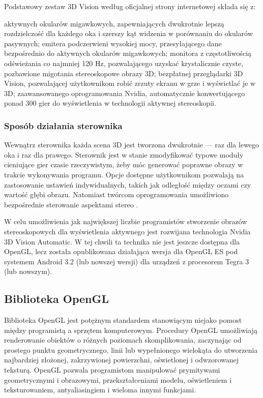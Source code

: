 Podstawowy zestaw 3D Vision według oficjalnej strony internetowej \cite{3dVisionInfo} składa się z: 
\begin{itemize}
\itemi aktywnych okularów migawkowych, zapewniających dwukrotnie lepszą rozdzielczość dla każdego oka i szerszy kąt widzenia w porównaniu do okularów pasywnych;
\itemi emitera podczerwieni wysokiej mocy, przesyłającego dane bezpośrednio do aktywnych okularów migawkowych;
\itemi monitora z częstotliwością odświeżania co najmniej 120 Hz, pozwalającego uzyskać krystalicznie czyste, pozbawione migotania stereoskopowe obrazy 3D;
\itemi bezpłatnej przeglądarki 3D Vision, pozwalającej użytkownikom robić zrzuty ekranu w grze i wyświetlać je w 3D;
\itemi zaawansowanego oprogramowania Nvidia, automatycznie konwertującego ponad 300 gier do wyświetlenia w technologii aktywnej stereoskopii. 
\end{itemize}

\subsubsection{Sposób działania sterownika}
Wewnątrz sterownika każda scena 3D jest tworzona dwukrotnie --- raz dla lewego oka i raz dla prawego. Sterownik jest w stanie zmodyfikować typowe moduły cieniujące gier czasie rzeczywistym, żeby móc generować poprawne obrazy w trakcie wykonywania programu. Opcje dostępne użytkownikom pozwalają na zastosowanie ustawień indywidualnych, takich jak odległość między oczami czy wartość głębi obrazu. Natomiast twórcom oprogramowania umożliwiono bezpośrednie sterowanie aspektami stereo \cite{3dVisionInfo}.

W celu umożliwienia jak największej liczbie programistów stworzenie obrazów stereoskopowych dla wyświetlenia aktywnego jest rozwijana technologia Nvidia 3D Vision Automatic. W tej chwili ta technika nie jest jeszcze dostępna dla OpenGL, lecz została opublikowana działająca wersja dla OpenGL ES pod systemem Android 3.2 (lub nowszej wersji) dla urządzeń z procesorem Tegra 3 (lub nowszym).

\subsection{Biblioteka OpenGL}
Biblioteka OpenGL jest potężnym standardem stanowiącym niejako pomost między programistą a sprzętem komputerowym. Procedury OpenGL umożliwiają renderowanie obiektów o różnych poziomach skomplikowania, zaczynając od prostego punktu geometrycznego, linii lub wypełnionego wielokąta do utworzenia najbardziej złożonej, zakrzywionej powierzchni, oświetlonej i odwzorowanej teksturą. OpenGL pozwala programistom manipulować prymitywami geometrycznymi i obrazowymi, przekształceniami modelu, oświetleniem i teksturowaniem, antyaliasingiem i wieloma innymi funkcjami. 

